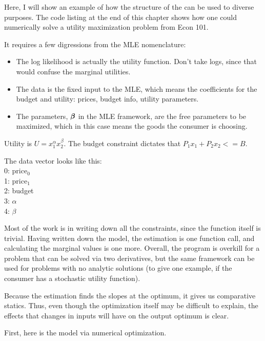 Here, I will show an example of how the structure of the
 can be used to diverse purposes.
The code listing at the end of this
chapter shows how one could numerically solve a utility maximization
problem from Econ 101. 

It requires a few digressions from the MLE nomenclature:
\begin{itemize}
\item The log likelihood is actually the utility function. Don't take logs,
since that would confuse the marginal utilities.

\item The data is the fixed input to the MLE, which means the
coefficients for the budget and utility:
prices, budget info, utility parameters.

\item The parameters, ${\mbox{\boldmath$\beta$}}$ in the MLE framework, are the free
parameters to be maximized, which in this case means the goods the
consumer is choosing.  \end{itemize}

Utility is $U = x_1^\alpha x_2^\beta$. 
The budget constraint dictates that $P_1 x_1 + P_2 x_2 <= B$.
                                                             
The data vector looks like this:\\
0:  price$_0$\\
1:  price$_1$\\
2:  budget \\
3:  $\alpha$  \\
4:  $\beta$   
                                                             
Most of the work is in writing down all the constraints, since the
function itself is trivial. Having written down the model, the estimation
is one function call, and calculating the marginal values is one more.
Overall, the program is overkill for a problem that can be solved via
two derivatives, but the same framework can be used for problems with no
analytic solutions (to give one example, if the consumer has a stochastic
utility function).

Because the estimation finds the slopes at the optimum, it gives us
comparative statics. Thus, even though the optimization itself may be
difficult to explain, the effects that changes in inputs will have on
the output optimum is clear.

First, here is the model via numerical optimization.



